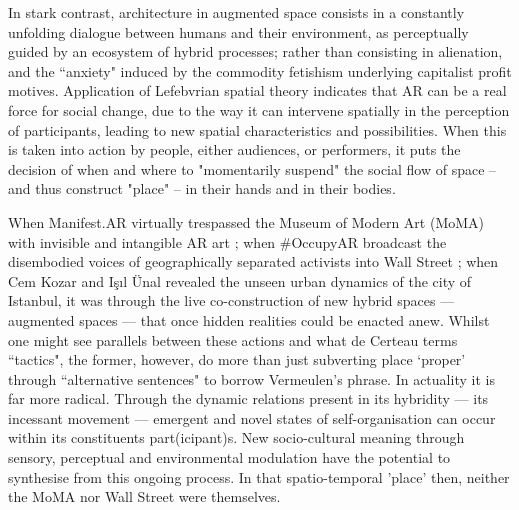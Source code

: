 In stark contrast, architecture in augmented space consists in a constantly unfolding dialogue between humans and their environment, as perceptually guided by an ecosystem of hybrid processes; rather than consisting in alienation, and the ``anxiety" induced by the commodity fetishism underlying capitalist profit motives. Application of Lefebvrian spatial theory indicates that AR can be a real force for social change, due to the way it can intervene spatially in the perception of participants, leading to new spatial characteristics and possibilities. When this is taken into action by people, either audiences, or performers, it puts the decision of when and where to "momentarily suspend" the social flow of space -- and thus construct "place" -- in their hands and in their bodies.

When Manifest.AR virtually trespassed the Museum of Modern Art (MoMA) with invisible and intangible AR art \citep{veenhof2010}; when \#OccupyAR broadcast the disembodied voices of geographically separated activists into Wall Street \citep{skwarek2018}; when Cem Kozar and Işıl Ünal \citeyearpar{thiel2011,thiel2018} revealed the unseen urban dynamics of the city of Istanbul, it was through the live co-construction of new hybrid spaces — augmented spaces — that once hidden realities could be enacted anew. Whilst one might see parallels between these actions and what de Certeau terms ``tactics", the former, however, do more than just subverting place `proper' through ``alternative sentences" to borrow Vermeulen's phrase. In actuality it is far more radical. Through the dynamic relations present in its hybridity — its incessant movement — emergent and novel states of self-organisation can occur within its constituents part(icipant)s. New socio-cultural meaning through sensory, perceptual and environmental modulation have the potential to synthesise from this ongoing process. In that spatio-temporal 'place' then, neither the MoMA nor Wall Street were themselves.



